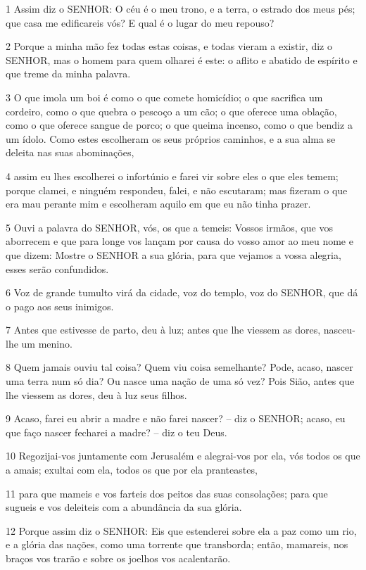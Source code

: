 \par 1 Assim diz o SENHOR: O céu é o meu trono, e a terra, o estrado dos meus pés; que casa me edificareis vós? E qual é o lugar do meu repouso?
\par 2 Porque a minha mão fez todas estas coisas, e todas vieram a existir, diz o SENHOR, mas o homem para quem olharei é este: o aflito e abatido de espírito e que treme da minha palavra.
\par 3 O que imola um boi é como o que comete homicídio; o que sacrifica um cordeiro, como o que quebra o pescoço a um cão; o que oferece uma oblação, como o que oferece sangue de porco; o que queima incenso, como o que bendiz a um ídolo. Como estes escolheram os seus próprios caminhos, e a sua alma se deleita nas suas abominações,
\par 4 assim eu lhes escolherei o infortúnio e farei vir sobre eles o que eles temem; porque clamei, e ninguém respondeu, falei, e não escutaram; mas fizeram o que era mau perante mim e escolheram aquilo em que eu não tinha prazer.
\par 5 Ouvi a palavra do SENHOR, vós, os que a temeis: Vossos irmãos, que vos aborrecem e que para longe vos lançam por causa do vosso amor ao meu nome e que dizem: Mostre o SENHOR a sua glória, para que vejamos a vossa alegria, esses serão confundidos.
\par 6 Voz de grande tumulto virá da cidade, voz do templo, voz do SENHOR, que dá o pago aos seus inimigos.
\par 7 Antes que estivesse de parto, deu à luz; antes que lhe viessem as dores, nasceu-lhe um menino.
\par 8 Quem jamais ouviu tal coisa? Quem viu coisa semelhante? Pode, acaso, nascer uma terra num só dia? Ou nasce uma nação de uma só vez? Pois Sião, antes que lhe viessem as dores, deu à luz seus filhos.
\par 9 Acaso, farei eu abrir a madre e não farei nascer? -- diz o SENHOR; acaso, eu que faço nascer fecharei a madre? -- diz o teu Deus.
\par 10 Regozijai-vos juntamente com Jerusalém e alegrai-vos por ela, vós todos os que a amais; exultai com ela, todos os que por ela pranteastes,
\par 11 para que mameis e vos farteis dos peitos das suas consolações; para que sugueis e vos deleiteis com a abundância da sua glória.
\par 12 Porque assim diz o SENHOR: Eis que estenderei sobre ela a paz como um rio, e a glória das nações, como uma torrente que transborda; então, mamareis, nos braços vos trarão e sobre os joelhos vos acalentarão.
